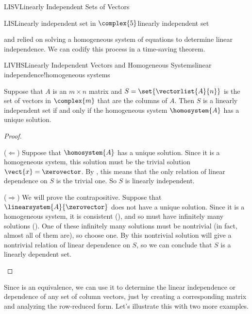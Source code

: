 \begin{subsect}{LISV}{Linearly Independent Sets of Vectors}
\begin{example}{LIS}{Linearly independent set in $\complex{5}$}{linearly independent set}
\begin{para}
\end{para}
%
\end{example}
%
\begin{para} and  relied on solving a homogeneous system of equations to determine linear independence.  We can codify this process in a time-saving theorem.
\end{para}
%
\begin{theorem}{LIVHS}{Linearly Independent Vectors and Homogeneous Systems}{linear independence!homogeneous systems}
\begin{para}Suppose that $A$ is an $m\times n$ matrix and $S=\set{\vectorlist{A}{n}}$ is the set of vectors in $\complex{m}$ that are the columns of $A$.  Then $S$ is a linearly independent set if and only if the homogeneous system $\homosystem{A}$ has a unique solution.\end{para}
\end{theorem}
%
\begin{proof}
\begin{para}($\Leftarrow$)  Suppose that $\homosystem{A}$ has a unique solution.  Since it is a homogeneous system, this solution must be the trivial solution $\vect{x}=\zerovector$.  By , this means that the only relation of linear dependence on $S$ is the trivial one.  So $S$ is linearly independent.\end{para}
%
\begin{para}($\Rightarrow$)  We will prove the contrapositive.  Suppose that $\linearsystem{A}{\zerovector}$ does not have a unique solution.  Since it is a homogeneous system, it is consistent (), and so must have infinitely many solutions ().  One of these infinitely many solutions must be nontrivial (in fact, almost all of them are), so choose one.  By  this nontrivial solution will give a nontrivial relation of linear dependence on $S$, so we can conclude that $S$ is a linearly dependent set.\end{para}
\end{proof}
%
\begin{para}Since  is an equivalence, we can use it to determine the linear independence or dependence of any set of column vectors, just by creating a corresponding matrix and analyzing the row-reduced form.  Let's illustrate this with two more examples.
\end{para}

\end{subsect}
